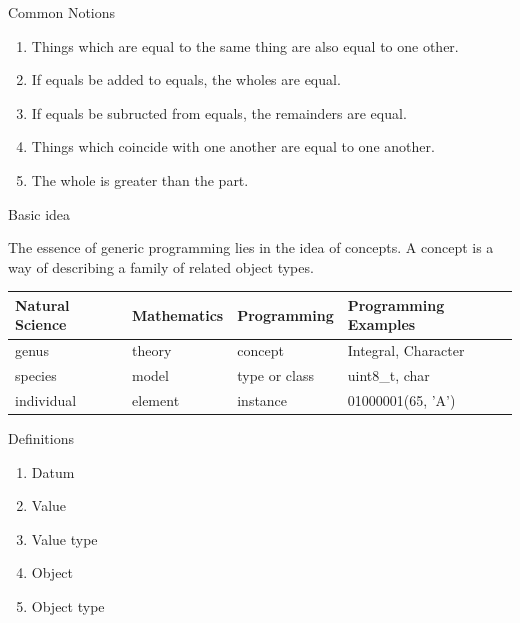 \documentclass[10pt]{beamer}
\begin{document}
\begin{frame}{Common Notions}
\begin{enumerate}
	\item Things which are equal to the same thing are also equal to one other.
	\item If equals be added to equals, the wholes are equal.
	\item If equals be subructed from equals, the remainders are equal.
	\item Things which coincide with one another are equal to one another.
	\item The whole is greater than the part.
\end{enumerate}
\end{frame}



\begin{frame}{Basic idea}
\begin{block}{}
The essence of generic programming lies in the idea of concepts. A concept is a way of describing a family of related object types.
\end{block}
\begin{center}
    \begin{tabular}{ | p{1.5cm} | l | l | p{3cm} |}
    \hline
    \textbf{Natural Science} & \textbf{Mathematics} & \textbf{Programming} & \textbf{Programming Examples} \\ \hline
      genus & theory & concept & Integral, Character \\ \hline
      species & model & type or class & uint8\_t, char \\ \hline
      individual & element & instance  & 01000001(65, 'A') \\
    \hline
    \end{tabular}
\end{center}
\end{frame}


\begin{frame}[fragile]{Definitions}
  \begin{enumerate}
    \item Datum
    \item Value
    \item Value type
    \item Object
    \item Object type
  \end{enumerate}
\end{frame}
\end{document}
